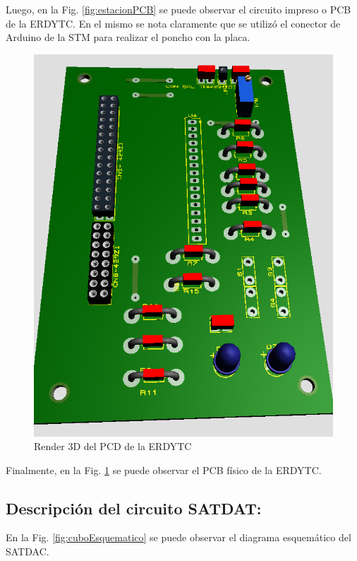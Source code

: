 \documentclass[conference]{IEEEtran}
\begin{document}
Luego, en la Fig. \ref{fig:estacionPCB} se puede observar el circuito impreso o PCB de la ERDYTC. En el mismo se nota claramente que se utilizó el conector de Arduino de la STM para realizar el poncho con la placa.

\begin{figure}[htbp]
\centering
\includegraphics[width=.9\linewidth]{../../images/estacion3D.png}
\caption{\label{fig:estacion3D}Render 3D del PCD de la ERDYTC}
\end{figure}

Finalmente, en la Fig. \ref{fig:estacion3D} se puede observar el PCB físico de la ERDYTC.
\subsection{Descripción del circuito SATDAT:}
\label{sec:org96f9a21}
En la Fig. \ref{fig:cuboEsquematico} se puede observar el diagrama esquemático del SATDAC.
\end{document}
